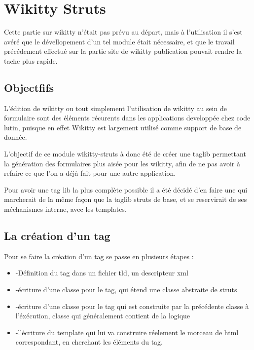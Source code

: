 \section{Wikitty Struts}

Cette partie sur wikitty n'était pas prévu au départ, mais à l'utilisation
il s'est avéré que le dévellopement d'un tel module était nécessaire, et que
le travail précédement effectué sur la partie site de wikitty publication
pouvait rendre la tache plus rapide.


\subsection{Objectfifs}

L'édition de wikitty ou tout simplement l'utilisation de wikitty au sein de 
formulaire sont des éléments récurents dans les applications developpée 
chez code lutin, puisque en effet Wikitty est largement utilisé comme support
de base de donnée. 

L'objectif de ce module wikitty-struts à donc été de créer une taglib permettant
la génération des formulaires plus aisée pour les wikitty, afin de ne pas 
avoir à refaire ce que l'on a déjà fait pour une autre application.

Pour avoir une tag lib la plus complète possible il a été décidé d'en faire une
qui marcherait de la même façon que la taglib struts de base, et se reservirait
de ses méchanismes interne, avec les templates.

\subsection{La création d'un tag}

Pour se faire la création d'un tag se passe en plusieurs étapes :

\begin{itemize}
\item -Définition du tag dans un fichier tld, un descripteur xml
\item -écriture d'une classe pour le tag, qui étend une classe abstraite de struts
\item -écriture d'une classe pour le tag qui est construite par la précédente 
classe à l'éxécution, classe qui généralement contient de la logique
\item -l'écriture du template qui lui va construire réelement le morceau de html 
correspondant, en cherchant les éléments du tag.
\end{itemize}

